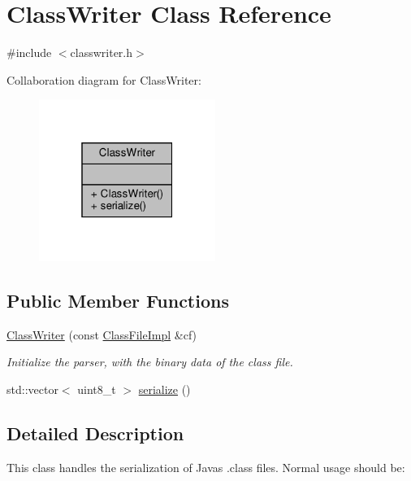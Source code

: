 \hypertarget{classClassWriter}{}\section{Class\+Writer Class Reference}
\label{classClassWriter}


{\ttfamily \#include $<$classwriter.\+h$>$}



Collaboration diagram for Class\+Writer\+:\nopagebreak
\begin{figure}[H]
\begin{center}
\leavevmode
\includegraphics[width=163pt]{classClassWriter__coll__graph}
\end{center}
\end{figure}
\subsection*{Public Member Functions}
\begin{DoxyCompactItemize}
\item 
\mbox{\label{classClassWriter_a4335e4ecbd5dfe24d08137201a87a298}} 
\hyperlink{classClassWriter_a4335e4ecbd5dfe24d08137201a87a298}{Class\+Writer} (const \hyperlink{classClassFileImpl}{Class\+File\+Impl} \&cf)
\begin{DoxyCompactList}\small\item\em Initialize the parser, with the binary {\ttfamily data} of the class file. \end{DoxyCompactList}\item 
std\+::vector$<$ uint8\+\_\+t $>$ \hyperlink{classClassWriter_a7be4d13b5665b1e85a8a350ec181951c}{serialize} ()
\end{DoxyCompactItemize}


\subsection{Detailed Description}
This class handles the serialization of Java\textquotesingle{}s .class files. Normal usage should be\+: 

